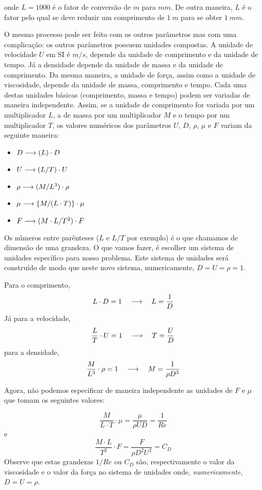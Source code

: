 onde $L = 1000$ é o fator de conversão de $m$ para $mm$. De outra maneira, $L$ é o fator pelo qual se deve reduzir um comprimento de $1\:m$ para se obter $1\:mm$.

O mesmo processo pode ser feito com os outros parâmetros mas com uma complicação: os outros parâmetros possuem unidades compostas. A unidade de velocidade $U$ em SI é $m/s$, depende da unidade de comprimento e da unidade de tempo. Já a densidade depende da unidade de massa e da unidade de comprimento. Da mesma maneira, a unidade de força, assim como a unidade de viscosidade,  depende da unidade de massa, comprimento e tempo. Cada uma destas unidades básicas (comprimento, massa e tempo) podem ser variadas de maneira independente. Assim, se a unidade de comprimento for variada por um multiplicador $L$, a de massa por um multiplicador $M$ e o tempo por um multiplicador $T$, os valores numéricos dos parâmetros $U$, $D$, $\rho$, $\mu$ e $F$ variam da seguinte maneira:

\begin{itemize}
\item $D \longrightarrow (L) \cdot D$
\item $U \longrightarrow (L/T) \cdot U$
\item $\rho \longrightarrow  (M/L^3) \cdot\rho$
\item $\mu \longrightarrow \{M/(L\cdot T)\}\cdot\mu$
\item $F \longrightarrow (M \cdot L / T^2) \cdot F$
\end{itemize}

Os números entre parênteses ($L$ e $L/T$ por exemplo) é o que chamamos de dimensão de uma grandeza. O que vamos fazer, é escolher um sistema de unidades específico para nosso problema. Este sistema de unidades será construído de modo que neste novo sistema, numericamente, $D = U = \rho = 1$.

Para o comprimento,
\[
L \cdot D = 1 \quad\longrightarrow\quad L = \frac{1}{D}
\]
Já para a velocidade,
\[
\frac{L}{T} \cdot U = 1 \quad\longrightarrow\quad T = \frac{U}{D}
\]
para a densidade,
\[
\frac{M}{L^3} \cdot \rho = 1 \quad\longrightarrow\quad M = \frac{1}{\rho D^3}
\]

Agora, não podemos especificar de maneira independente as unidades de $F$ e $\mu$ que tomam os seguintes valores:

\[
\frac{M}{L\cdot T} \cdot \mu = \frac{\mu}{\rho U D} = \frac{1}{Re}
\]
e
\[
\frac{M\cdot L}{T^2} \cdot F = \frac{F}{\rho D^2 U^2} = C_D
\]
Observe que estas grandezas $1/Re$ ou $C_D$ são, respectivamente o valor da viscosidade e o valor da força no sistema de unidades onde, \emph{numericamente},  $D = U = \rho$.


